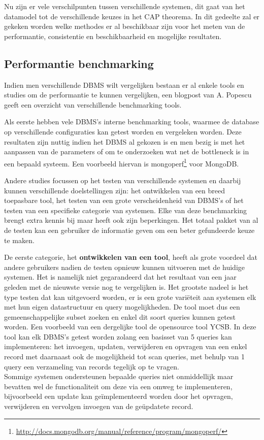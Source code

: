 Nu zijn er vele verschilpunten tussen verschillende systemen, dit gaat van het datamodel tot de verschillende keuzes in het CAP theorema. In dit gedeelte zal er gekeken worden welke methodes er al beschikbaar zijn voor het meten van de performantie, consistentie en beschikbaarheid en mogelijke resultaten. 

\subsection{Performantie benchmarking}
Indien men verschillende DBMS wilt vergelijken bestaan er al enkele tools en studies om de performantie te kunnen vergelijken, een blogpost van A. Popescu \cite{PopescuBenchmarkOverview} geeft een overzicht van verschillende benchmarking tools. 

Als eerste hebben vele DBMS's interne benchmarking tools, waarmee de database op verschillende configuraties kan getest worden en vergeleken worden. Deze resultaten zijn nuttig indien het DBMS al gekozen is en men bezig is met het aanpassen van de parameters of om te onderzoeken wat net de bottleneck is in een bepaald systeem. Een voorbeeld hiervan is mongoperf\footnote{\url{http://docs.mongodb.org/manual/reference/program/mongoperf/}} voor MongoDB. 

Andere studies focussen op het testen van verschillende systemen en daarbij kunnen verschillende doelstellingen zijn: het ontwikkelen van een breed toepasbare tool, het testen van een grote verscheidenheid van DBMS's of het testen van een specifieke categorie van systemen. Elke van deze benchmarking brengt extra kennis bij maar heeft ook zijn beperkingen. Het totaal pakket van al de testen kan een gebruiker de informatie geven om een beter gefundeerde keuze te maken. 

De eerste categorie, het \textbf{ontwikkelen van een tool}, heeft als grote voordeel dat andere gebruikers nadien de testen opnieuw kunnen uitvoeren met de huidige systemen. Het is namelijk niet gegarandeerd dat het resultaat van een jaar geleden met de nieuwste versie nog te vergelijken is.
Het grootste nadeel is het type testen dat kan uitgevoerd worden, er is een grote variëteit aan systemen elk met hun eigen datastructuur en query mogelijkheden. De tool moet dus een gemeenschappelijke subset zoeken en enkel dit soort queries kunnen getest worden. Een voorbeeld van een dergelijke tool de opensource tool YCSB\cite{cooper2010benchmarking}. In deze tool kan elk DBMS's getest worden zolang een basisset van 5 queries kan implementeren: het invoegen, updaten, verwijderen en opvragen van een enkel record met daarnaast ook de mogelijkheid tot scan queries, met behulp van 1 query een verzameling van records tegelijk op te vragen. \\
Sommige systemen ondersteunen bepaalde queries niet onmiddellijk maar bevatten wel de functionaliteit om deze via een omweg te implementeren, bijvoorbeeld een update kan geïmplementeerd worden door het opvragen, verwijderen en vervolgen invoegen van de geüpdatete record. 

